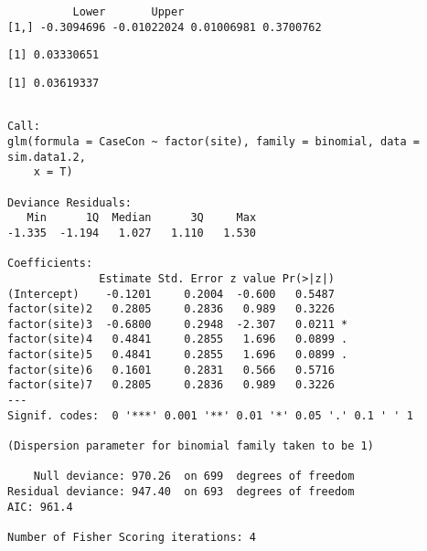 \documentclass[12pt,twoside]{dukestatscithesis}
\theoremstyle{definition}
\theoremstyle{definition}
\theoremstyle{definition}
\theoremstyle{remark}
\begin{document}
\begin{verbatim}
          Lower       Upper                     
[1,] -0.3094696 -0.01022024 0.01006981 0.3700762
\end{verbatim}
\begin{Shaded}
\begin{Highlighting}[]
\OperatorTok{$}\OperatorTok{$}\OperatorTok{$}
\end{Highlighting}
\end{Shaded}
\begin{verbatim}
[1] 0.03330651
\end{verbatim}
\begin{Shaded}
\begin{Highlighting}[]
\OperatorTok{$}\OperatorTok{$}\OperatorTok{$}
\end{Highlighting}
\end{Shaded}
\begin{verbatim}
[1] 0.03619337
\end{verbatim}
\begin{Shaded}
\begin{Highlighting}[]
\NormalTok{ =}\StringTok{ }\OperatorTok{~}\StringTok{ }

\NormalTok{)}
\end{Highlighting}
\end{Shaded}
\begin{verbatim}

Call:
glm(formula = CaseCon ~ factor(site), family = binomial, data = sim.data1.2, 
    x = T)

Deviance Residuals: 
   Min      1Q  Median      3Q     Max  
-1.335  -1.194   1.027   1.110   1.530  

Coefficients:
              Estimate Std. Error z value Pr(>|z|)  
(Intercept)    -0.1201     0.2004  -0.600   0.5487  
factor(site)2   0.2805     0.2836   0.989   0.3226  
factor(site)3  -0.6800     0.2948  -2.307   0.0211 *
factor(site)4   0.4841     0.2855   1.696   0.0899 .
factor(site)5   0.4841     0.2855   1.696   0.0899 .
factor(site)6   0.1601     0.2831   0.566   0.5716  
factor(site)7   0.2805     0.2836   0.989   0.3226  
---
Signif. codes:  0 '***' 0.001 '**' 0.01 '*' 0.05 '.' 0.1 ' ' 1

(Dispersion parameter for binomial family taken to be 1)

    Null deviance: 970.26  on 699  degrees of freedom
Residual deviance: 947.40  on 693  degrees of freedom
AIC: 961.4

Number of Fisher Scoring iterations: 4
\end{verbatim}
\end{document}
